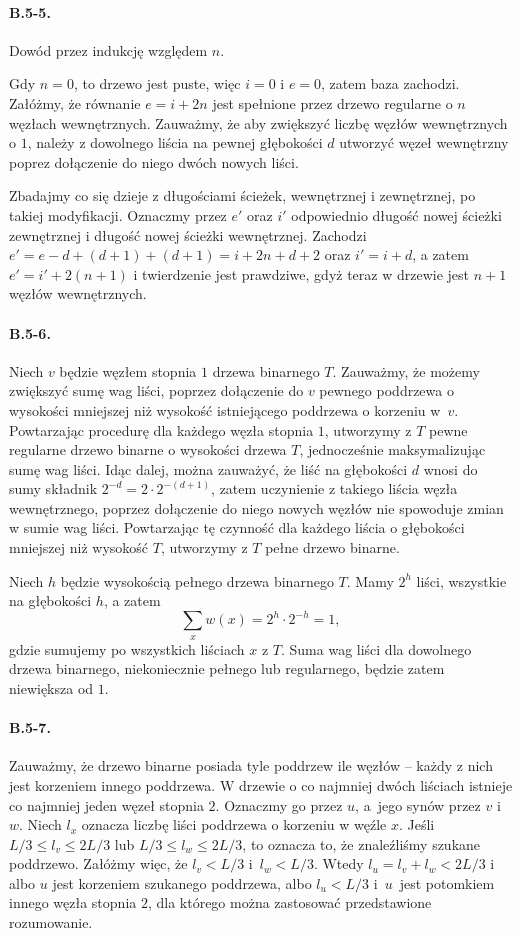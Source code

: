\paragraph{B.5-5.}
Dowód przez indukcję względem $n$.

Gdy $n=0$, to drzewo jest puste, więc $i=0$ i $e=0$, zatem baza zachodzi. Załóżmy, że równanie $e=i+2n$ jest spełnione przez drzewo regularne o $n$ węzłach wewnętrznych. Zauważmy, że aby zwiększyć liczbę węzłów wewnętrznych o $1$, należy z dowolnego liścia na pewnej głębokości $d$ utworzyć węzeł wewnętrzny poprez dołączenie do niego dwóch nowych liści.

Zbadajmy co się dzieje z długościami ścieżek, wewnętrznej i zewnętrznej, po takiej modyfikacji. Oznaczmy przez $e'$ oraz $i'$ odpowiednio długość nowej ścieżki zewnętrznej i długość nowej ścieżki wewnętrznej. Zachodzi $e'=e-d+(d+1)+(d+1)=i+2n+d+2$ oraz $i'=i+d$, a zatem $e'=i'+2(n+1)$ i twierdzenie jest prawdziwe, gdyż teraz w drzewie jest $n+1$ węzłów wewnętrznych.

\paragraph{B.5-6.}
Niech $v$ będzie węzłem stopnia $1$ drzewa binarnego $T$. Zauważmy, że możemy zwiększyć sumę wag liści, poprzez dołączenie do $v$ pewnego poddrzewa o wysokości mniejszej niż wysokość istniejącego poddrzewa o korzeniu w~$v$. Powtarzając procedurę dla każdego węzła stopnia $1$, utworzymy z $T$ pewne regularne drzewo binarne o wysokości drzewa $T$, jednocześnie maksymalizując sumę wag liści. Idąc dalej, można zauważyć, że liść na głębokości $d$ wnosi do sumy składnik $2^{-d}=2\cdot 2^{-(d+1)}$, zatem uczynienie z takiego liścia węzła wewnętrznego, poprzez dołączenie do niego nowych węzłów nie spowoduje zmian w sumie wag liści. Powtarzając tę czynność dla każdego liścia o głębokości mniejszej niż wysokość $T$, utworzymy z $T$ pełne drzewo binarne.

Niech $h$ będzie wysokością pełnego drzewa binarnego $T$. Mamy $2^h$ liści, wszystkie na głębokości $h$, a zatem
\[
	\sum_{x}w(x)=2^h\cdot 2^{-h}=1,
\]
gdzie sumujemy po wszystkich liściach $x$ z $T$. Suma wag liści dla dowolnego drzewa binarnego, niekoniecznie pełnego lub regularnego, będzie zatem niewiększa od $1$.

\paragraph{B.5-7.}
Zauważmy, że drzewo binarne posiada tyle poddrzew ile węzłów -- każdy z nich jest korzeniem innego poddrzewa. W drzewie o co najmniej dwóch liściach istnieje co najmniej jeden węzeł stopnia $2$. Oznaczmy go przez $u$, a~jego synów przez $v$ i $w$.  Niech $l_x$ oznacza liczbę liści poddrzewa o korzeniu w węźle $x$. Jeśli $L/3\le l_v\le 2L/3$ lub $L/3\le l_w\le 2L/3$, to oznacza to, że znaleźliśmy szukane poddrzewo. Załóżmy więc, że $l_v<L/3$ i~$l_w<L/3$. Wtedy $l_u=l_v+l_w<2L/3$ i albo $u$ jest korzeniem szukanego poddrzewa, albo $l_u<L/3$ i~$u$~jest potomkiem innego węzła stopnia $2$, dla którego można zastosować przedstawione rozumowanie.

